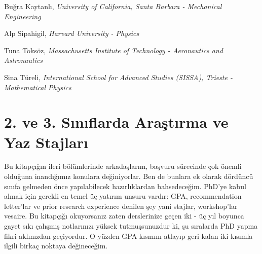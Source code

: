 \documentclass[12pt]{article}
\begin{document}
Buğra Kaytanlı, \textit{University of California, Santa Barbara - Mechanical Engineering}

Alp Sipahigil, \textit{Harvard University - Physics }

Tuna Toksöz, \textit{Massachusetts Institute of Technology - Aeronautics and Astronautics }

Sina Türeli, \textit{International School for Advanced Studies (SISSA), Trieste - Mathematical Physics}

\newpage
%
%
\section{2. ve 3. Sınıflarda Araştırma ve Yaz Stajları}
Bu kitapçığın ileri bölümlerinde arkadaşlarım, başvuru sürecinde çok önemli olduğuna inandığımız konulara değiniyorlar. Ben de bunlara ek olarak dördüncü sınıfa gelmeden önce yapılabilecek hazırlıklardan bahsedeceğim. PhD’ye kabul almak için gerekli en temel üç yatırım unsuru vardır: GPA, recommendation letter’lar ve prior research experience denilen şey yani stajlar, workshop’lar vesaire. Bu kitapçığı okuyorsanız zaten derslerinize geçen iki - üç yıl boyunca gayet sıkı çalışmış notlarınızı yüksek tutmuşsunuzdur ki, şu sıralarda PhD yapma fikri aklınızdan geçiyordur. O yüzden GPA kısmını atlayıp geri kalan iki kısımla ilgili birkaç noktaya değineceğim.
\end{document}
